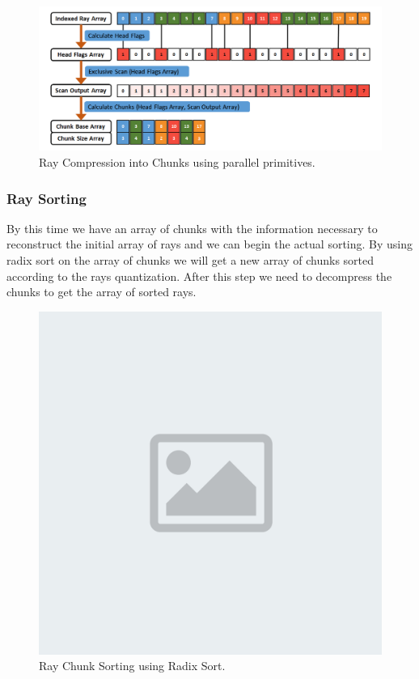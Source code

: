 \documentclass{llncs}
\begin{document}
\begin{figure}
\centering
\includegraphics[scale=0.45]{images/figure 10.png}
\caption{Ray Compression into Chunks using parallel primitives.}
\label{fig:ray-compression}
\end{figure}

%
\subsubsection{Ray Sorting}
%

By this time we have an array of chunks with the information necessary to reconstruct the initial array of rays and we can begin the actual sorting. By using radix sort \cite{Satish09} on the array of chunks we will get a new array of chunks sorted according to the rays quantization. After this step we need to decompress the chunks to get the array of sorted rays.

\begin{figure}
\centering
\includegraphics[scale=0.025]{images/placeholder.png}
\caption{Ray Chunk Sorting using Radix Sort.}
\label{fig:ray-sorting}
\end{figure}
\end{document}
